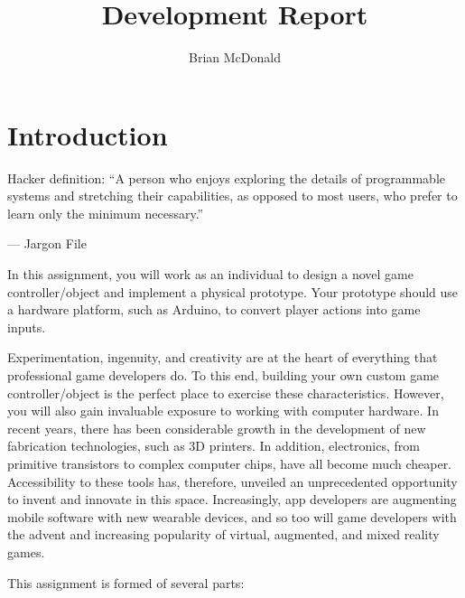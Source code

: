 \documentclass{../../fal_assignment}
\title{Development Report}
\author{Brian McDonald}
\begin{document}
\maketitle

\section*{Introduction}

\begin{marginquote}
Hacker definition: ``A person who enjoys exploring the details of programmable systems and stretching their capabilities, as opposed to most users, who prefer to learn only the minimum necessary.''

--- Jargon File

\end{marginquote}

In this assignment, you will work as an individual to design a novel game controller/object and implement a physical prototype. Your prototype should use a hardware platform, such as Arduino, to convert player actions into game inputs. 

Experimentation, ingenuity, and creativity are at the heart of everything that professional game developers do. To this end, building your own custom game controller/object is the perfect place to exercise these characteristics. However, you will also gain invaluable exposure to working with computer hardware. In recent years, there has been considerable growth in the development of new fabrication technologies, such as 3D printers. In addition, electronics, from primitive transistors to complex computer chips, have all become much cheaper. Accessibility to these tools has, therefore, unveiled an unprecedented opportunity to invent and innovate in this space. Increasingly, app developers are augmenting mobile software with new wearable devices, and so too will game developers with the advent and increasing popularity of virtual, augmented, and mixed reality games.


This assignment is formed of several parts:
\end{document}
